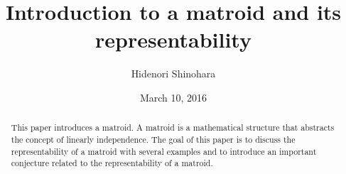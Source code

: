 \documentclass[psamsfonts]{amsart}
\title{Introduction to a matroid and its representability}
\author{Hidenori Shinohara}
\date{March 10, 2016}
\theoremstyle{definition}
\theoremstyle{remark}
\numberwithin{equation}{section}
\begin{document}
\begin{abstract}
This paper introduces a matroid. 
A matroid is a mathematical structure that abstracts the concept of linearly independence.
The goal of this paper is to discuss the representability of a matroid with several examples and to introduce an important conjecture related to the representability of a matroid.
\end{abstract}

\maketitle









\end{document}
